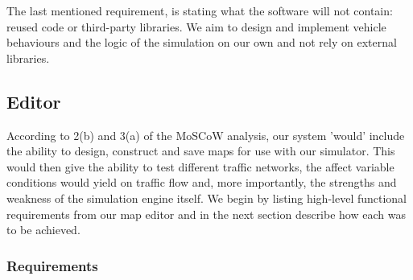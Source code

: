 The last mentioned requirement, is stating what the software will not contain: reused code or third-party libraries. We aim to design and implement vehicle behaviours and the logic of the simulation on our own and not rely on external libraries.

\pagebreak

\subsection{Editor}\label{ss:req-editor}
According to 2(b) and 3(a) of the MoSCoW analysis, our system 'would' include the ability to design, construct and save maps for use with our simulator.  This would then give the ability to test different traffic networks, the affect variable conditions would yield on traffic flow and, more importantly, the strengths and weakness of the simulation engine itself. We begin by listing high-level functional requirements from our map editor and in the next section describe how each was to be achieved.

\subsubsection{Requirements}

